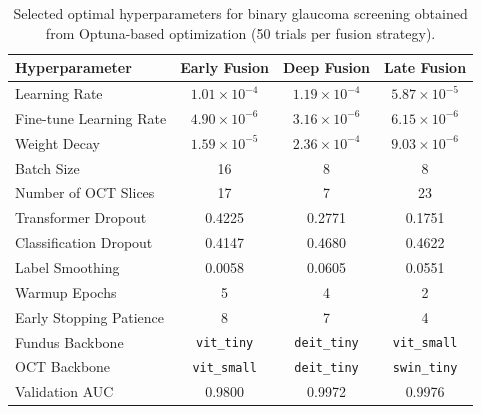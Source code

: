 \documentclass[preprint,12pt]{elsarticle}
\begin{document}
\begin{table}[htb]
    \centering
    \caption{Selected optimal hyperparameters for binary glaucoma screening obtained from Optuna-based optimization (50 trials per fusion strategy).}
    \label{tab:optimum-hyperparameters}
    \scriptsize
    \setlength{\tabcolsep}{6pt}
    \begin{tabular}{|l|c|c|c|}
        \hline
        \textbf{Hyperparameter} & \textbf{Early Fusion} & \textbf{Deep Fusion} & \textbf{Late Fusion} \\
        \hline
        Learning Rate           & $1.01\times10^{-4}$   & $1.19\times10^{-4}$  & $5.87\times10^{-5}$  \\
        Fine-tune Learning Rate & $4.90\times10^{-6}$   & $3.16\times10^{-6}$  & $6.15\times10^{-6}$  \\
        Weight Decay            & $1.59\times10^{-5}$   & $2.36\times10^{-4}$  & $9.03\times10^{-6}$  \\
        Batch Size              & 16                    & 8                    & 8                    \\
        Number of OCT Slices    & 17                    & 7                    & 23                   \\
        Transformer Dropout     & 0.4225                & 0.2771               & 0.1751               \\
        Classification Dropout  & 0.4147                & 0.4680               & 0.4622               \\
        Label Smoothing         & 0.0058                & 0.0605               & 0.0551               \\
        Warmup Epochs           & 5                     & 4                    & 2                    \\
        Early Stopping Patience & 8                     & 7                    & 4                    \\
        Fundus Backbone         & \texttt{vit\_tiny}    & \texttt{deit\_tiny}  & \texttt{vit\_small}  \\
        OCT Backbone            & \texttt{vit\_small}   & \texttt{deit\_tiny}  & \texttt{swin\_tiny}  \\
        \hline
        Validation AUC          & 0.9800                & 0.9972               & 0.9976               \\
        \hline
    \end{tabular}
\end{table}
\end{document}
